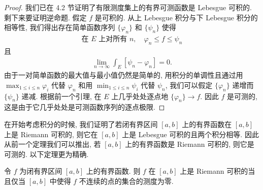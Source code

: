 \documentclass[../../main.tex]{subfiles}
\begin{document}
\begin{proof}
我们已在 4.2 节证明了有限测度集上的有界可测函数是 Lebesgue 可积的. 剩下来要证明逆命题. 假定 $f$ 是可积的. 从上 Lebesgue 积分与下 Lebesgue 积分的相等性, 我们得出存在简单函数序列 $\{\varphi_{n}\}$ 和 $\{\psi_{n}\}$ 使得
\begin{align*}
\text{在 }E\text{ 上对所有 }n,\quad\varphi_{n}\leqslant f\leqslant\psi_{n}
\end{align*}
且
\begin{align*}
\lim_{n\to\infty}\int_{E}[\psi_{n}-\varphi_{n}]=0.
\end{align*}
由于一对简单函数的最大值与最小值仍然是简单的, 用积分的单调性且通过用 $\max_{1\leqslant i\leqslant n}\varphi_{i}$ 代替 $\varphi_{n}$ 和用 $\min_{1\leqslant i\leqslant n}\psi_{i}$ 代替 $\psi_{n}$, 我们可以假定 $\{\varphi_{n}\}$ 递增而 $\{\psi_{n}\}$ 递减. 根据前一个引理, 在 $E$ 上几乎处处逐点地 $\{\varphi_{n}\}\to f$. 因此 $f$ 是可测的, 这是由于它几乎处处是可测函数序列的逐点极限.
\end{proof}

在开始考虑积分的时候, 我们证明了若闭有界区间 $[a,b]$ 上的有界函数在 $[a,b]$ 上是 Riemann 可积的, 则它在 $[a,b]$ 上是 Lebesgue 可积的且两个积分相等. 因此从前一个定理我们可以推出, 若 $[a,b]$ 上的有界函数是 Riemann 可积的, 则它是可测的. 以下定理更为精确.

\begin{theorem}[Lebesgue]\label{theorem:ch05-Riemann刻画}
令 $f$ 为闭有界区间 $[a,b]$ 上的有界函数. 则 $f$ 在 $[a,b]$ 上是 Riemann 可积的当且仅当 $[a,b]$ 中使得 $f$ 不连续的点的集合的测度为零.
\end{theorem}
\end{document}
